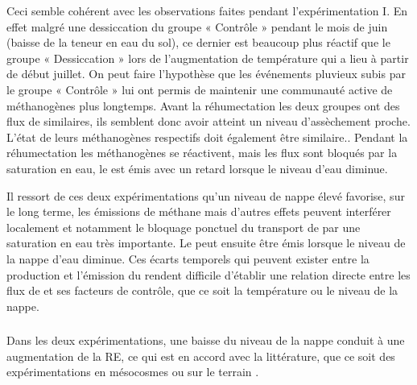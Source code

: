Ceci semble cohérent avec les observations faites pendant l'expérimentation I.
En effet malgré une dessiccation du groupe « Contrôle » pendant le mois de juin (baisse de la teneur en eau du sol), ce dernier est beaucoup plus réactif que le groupe « Dessiccation » lors de l'augmentation de température qui a lieu à partir de début juillet.
On peut faire l'hypothèse que les événements pluvieux subis par le groupe « Contrôle » lui ont permis de maintenir une communauté active de méthanogènes plus longtemps.
Avant la réhumectation les deux groupes ont des flux de \chh similaires, ils semblent donc avoir atteint un niveau d'assèchement proche.
L'état de leurs méthanogènes respectifs doit également être similaire..
Pendant la réhumectation les méthanogènes se réactivent, mais les flux sont bloqués par la saturation en eau, le \chh est émis avec un retard lorsque le niveau d'eau diminue.

Il ressort de ces deux expérimentations qu'un niveau de nappe élevé favorise, sur le long terme, les émissions de méthane mais d'autres effets peuvent interférer localement et notamment le bloquage ponctuel du transport de \chh par une saturation en eau très importante.
Le \chh peut ensuite être émis lorsque le niveau de la nappe d'eau diminue.
Ces écarts temporels qui peuvent exister entre la production et l'émission du \chh rendent difficile d'établir une relation directe entre les flux de \chh et ses facteurs de contrôle, que ce soit la température ou le niveau de la nappe.


\subsubsection{\coo}

Dans les deux expérimentations, une baisse du niveau de la nappe conduit à une augmentation de la RE, ce qui est en accord avec la littérature, que ce soit des expérimentations en mésocosmes \citet{blodau2004,dinsmore2009} ou sur le terrain \citet{ballantyne2014}. 

